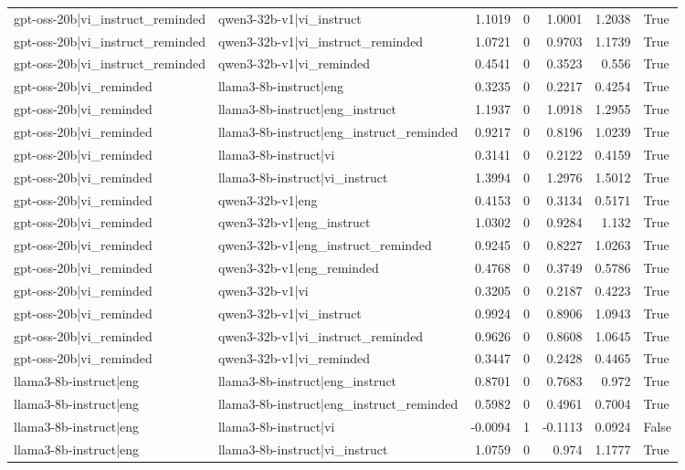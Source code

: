 \begin{table}
\begin{tabular}{l l r r r r l}
gpt-oss-20b|vi_instruct_reminded & qwen3-32b-v1|vi_instruct & 1.1019 & 0 & 1.0001 & 1.2038 & True \\
gpt-oss-20b|vi_instruct_reminded & qwen3-32b-v1|vi_instruct_reminded & 1.0721 & 0 & 0.9703 & 1.1739 & True \\
gpt-oss-20b|vi_instruct_reminded & qwen3-32b-v1|vi_reminded & 0.4541 & 0 & 0.3523 & 0.556 & True \\
gpt-oss-20b|vi_reminded & llama3-8b-instruct|eng & 0.3235 & 0 & 0.2217 & 0.4254 & True \\
gpt-oss-20b|vi_reminded & llama3-8b-instruct|eng_instruct & 1.1937 & 0 & 1.0918 & 1.2955 & True \\
gpt-oss-20b|vi_reminded & llama3-8b-instruct|eng_instruct_reminded & 0.9217 & 0 & 0.8196 & 1.0239 & True \\
gpt-oss-20b|vi_reminded & llama3-8b-instruct|vi & 0.3141 & 0 & 0.2122 & 0.4159 & True \\
gpt-oss-20b|vi_reminded & llama3-8b-instruct|vi_instruct & 1.3994 & 0 & 1.2976 & 1.5012 & True \\
gpt-oss-20b|vi_reminded & qwen3-32b-v1|eng & 0.4153 & 0 & 0.3134 & 0.5171 & True \\
gpt-oss-20b|vi_reminded & qwen3-32b-v1|eng_instruct & 1.0302 & 0 & 0.9284 & 1.132 & True \\
gpt-oss-20b|vi_reminded & qwen3-32b-v1|eng_instruct_reminded & 0.9245 & 0 & 0.8227 & 1.0263 & True \\
gpt-oss-20b|vi_reminded & qwen3-32b-v1|eng_reminded & 0.4768 & 0 & 0.3749 & 0.5786 & True \\
gpt-oss-20b|vi_reminded & qwen3-32b-v1|vi & 0.3205 & 0 & 0.2187 & 0.4223 & True \\
gpt-oss-20b|vi_reminded & qwen3-32b-v1|vi_instruct & 0.9924 & 0 & 0.8906 & 1.0943 & True \\
gpt-oss-20b|vi_reminded & qwen3-32b-v1|vi_instruct_reminded & 0.9626 & 0 & 0.8608 & 1.0645 & True \\
gpt-oss-20b|vi_reminded & qwen3-32b-v1|vi_reminded & 0.3447 & 0 & 0.2428 & 0.4465 & True \\
llama3-8b-instruct|eng & llama3-8b-instruct|eng_instruct & 0.8701 & 0 & 0.7683 & 0.972 & True \\
llama3-8b-instruct|eng & llama3-8b-instruct|eng_instruct_reminded & 0.5982 & 0 & 0.4961 & 0.7004 & True \\
llama3-8b-instruct|eng & llama3-8b-instruct|vi & -0.0094 & 1 & -0.1113 & 0.0924 & False \\
llama3-8b-instruct|eng & llama3-8b-instruct|vi_instruct & 1.0759 & 0 & 0.974 & 1.1777 & True \\

\end{tabular}
\end{table}
